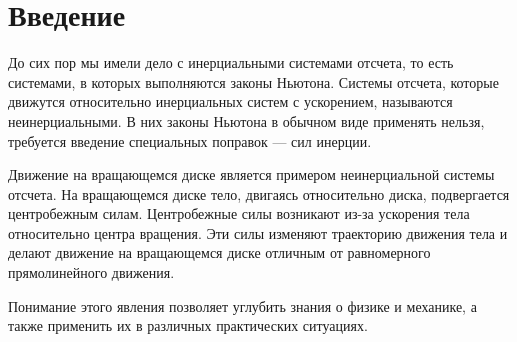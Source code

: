 \pagebreak

\section{Введение}
	До сих пор мы имели дело с инерциальными системами отсчета, то есть системами, в которых выполняются законы Ньютона. Системы отсчета, которые движутся относительно инерциальных систем с ускорением, называются неинерциальными. В них законы Ньютона в обычном виде применять нельзя, требуется введение специальных поправок — сил инерции.

	Движение на вращающемся диске является примером неинерциальной системы отсчета. На вращающемся диске тело, двигаясь относительно диска, подвергается центробежным силам. Центробежные силы возникают из-за ускорения тела относительно центра вращения. Эти силы изменяют траекторию движения тела и делают движение на вращающемся диске отличным от равномерного прямолинейного движения.

	Понимание этого явления позволяет углубить знания о физике и механике, а также применить их в различных практических ситуациях.


\pagebreak
